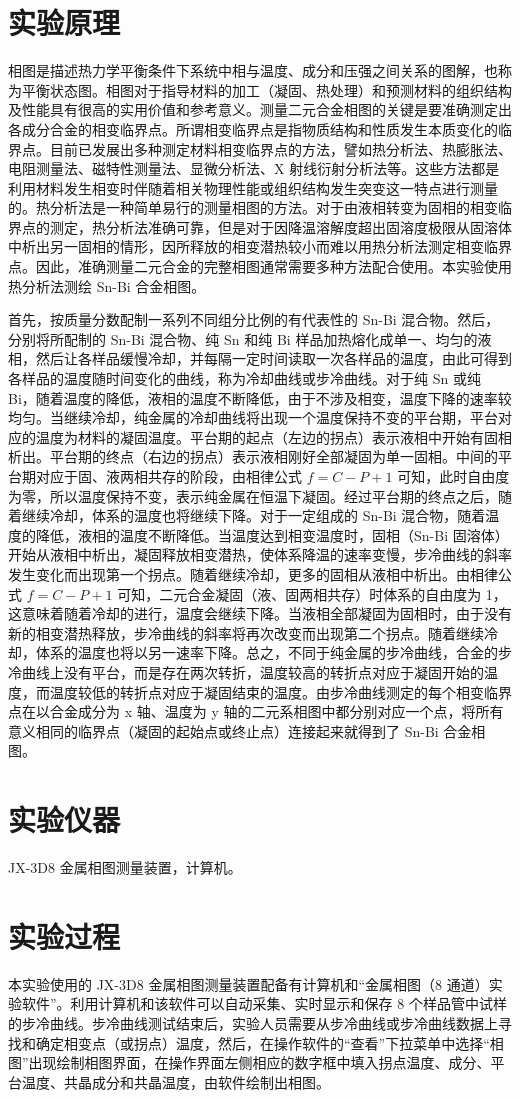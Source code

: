 \documentclass[a4paper,utf8]{article}
\begin{document}
\section{实验原理}%
    相图是描述热力学平衡条件下系统中相与温度、成分和压强之间关系的图解，也称为平衡状态图。相图对于指导材料的加工（凝固、热处理）和预测材料的组织结构及性能具有很高的实用价值和参考意义。测量二元合金相图的关键是要准确测定出各成分合金的相变临界点。所谓相变临界点是指物质结构和性质发生本质变化的临界点。目前已发展出多种测定材料相变临界点的方法，譬如热分析法、热膨胀法、电阻测量法、磁特性测量法、显微分析法、X 射线衍射分析法等。这些方法都是利用材料发生相变时伴随着相关物理性能或组织结构发生突变这一特点进行测量的。热分析法是一种简单易行的测量相图的方法。对于由液相转变为固相的相变临界点的测定，热分析法准确可靠，但是对于因降温溶解度超出固溶度极限从固溶体中析出另一固相的情形，因所释放的相变潜热较小而难以用热分析法测定相变临界点。因此，准确测量二元合金的完整相图通常需要多种方法配合使用。本实验使用热分析法测绘 Sn-Bi 合金相图。\par
    首先，按质量分数配制一系列不同组分比例的有代表性的 Sn-Bi 混合物。然后，分别将所配制的 Sn-Bi 混合物、纯 Sn 和纯 Bi 样品加热熔化成单一、均匀的液相，然后让各样品缓慢冷却，并每隔一定时间读取一次各样品的温度，由此可得到各样品的温度随时间变化的曲线，称为冷却曲线或步冷曲线。对于纯 Sn 或纯 Bi，随着温度的降低，液相的温度不断降低，由于不涉及相变，温度下降的速率较均匀。当继续冷却，纯金属的冷却曲线将出现一个温度保持不变的平台期，平台对应的温度为材料的凝固温度。平台期的起点（左边的拐点）表示液相中开始有固相析出。平台期的终点（右边的拐点）表示液相刚好全部凝固为单一固相。中间的平台期对应于固、液两相共存的阶段，由相律公式 $f=C-P+1$ 可知，此时自由度为零，所以温度保持不变，表示纯金属在恒温下凝固。经过平台期的终点之后，随着继续冷却，体系的温度也将继续下降。对于一定组成的 Sn-Bi 混合物，随着温度的降低，液相的温度不断降低。当温度达到相变温度时，固相（Sn-Bi 固溶体）开始从液相中析出，凝固释放相变潜热，使体系降温的速率变慢，步冷曲线的斜率发生变化而出现第一个拐点。随着继续冷却，更多的固相从液相中析出。由相律公式 $f=C-P+1$ 可知，二元合金凝固（液、固两相共存）时体系的自由度为 1，这意味着随着冷却的进行，温度会继续下降。当液相全部凝固为固相时，由于没有新的相变潜热释放，步冷曲线的斜率将再次改变而出现第二个拐点。随着继续冷却，体系的温度也将以另一速率下降。总之，不同于纯金属的步冷曲线，合金的步冷曲线上没有平台，而是存在两次转折，温度较高的转折点对应于凝固开始的温度，而温度较低的转折点对应于凝固结束的温度。由步冷曲线测定的每个相变临界点在以合金成分为 x 轴、温度为 y 轴的二元系相图中都分别对应一个点，将所有意义相同的临界点（凝固的起始点或终止点）连接起来就得到了 Sn-Bi 合金相图。
    
\section{实验仪器}%
    JX-3D8 金属相图测量装置，计算机。
\section{实验过程}%
    本实验使用的 JX-3D8 金属相图测量装置配备有计算机和“金属相图（8 通道）实验软件”。利用计算机和该软件可以自动采集、实时显示和保存 8 个样品管中试样的步冷曲线。步冷曲线测试结束后，实验人员需要从步冷曲线或步冷曲线数据上寻找和确定相变点（或拐点）温度，然后，在操作软件的“查看”下拉菜单中选择“相图”出现绘制相图界面，在操作界面左侧相应的数字框中填入拐点温度、成分、平台温度、共晶成分和共晶温度，由软件绘制出相图。
\end{document}
